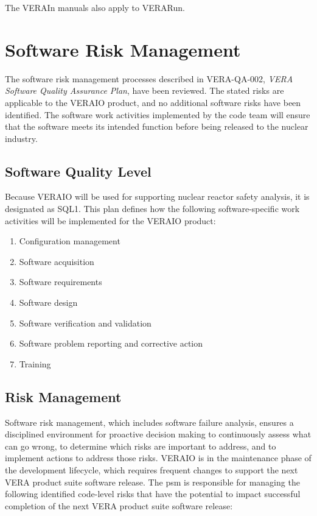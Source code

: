 \documentclass{vera-ornltm}
\begin{document}
The VERAIn manuals also apply to VERARun.


\section{Software Risk Management}

The software risk management processes described in VERA-QA-002, {\it VERA Software Quality Assurance Plan}, have been reviewed.
The stated risks are applicable to the VERAIO product, and no additional software risks have been identified.
The software work activities implemented by the code team will ensure that the software meets its intended function before being released to the nuclear industry.

\subsection{Software Quality Level}

Because VERAIO will be used for supporting nuclear reactor safety analysis, it is designated as SQL1.
This plan defines how the following software-specific work activities will be implemented for the VERAIO product:
\begin{enumerate}
\item Configuration management
\item Software acquisition
\item Software requirements
\item Software design
\item Software verification and validation
\item Software problem reporting and corrective action
\item Training
\end{enumerate}

\subsection{Risk Management}

Software risk management, which includes software failure analysis, ensures a disciplined environment for proactive decision making to continuously assess what can go wrong, to determine which risks are important to address, and to implement actions to address those risks.
VERAIO is in the maintenance phase of the development lifecycle, which requires frequent changes to support the next VERA product suite software release.
The \ac{psm} is responsible for managing the following identified code-level risks that have the potential to impact successful completion of the next VERA product suite software release:
\end{document}
